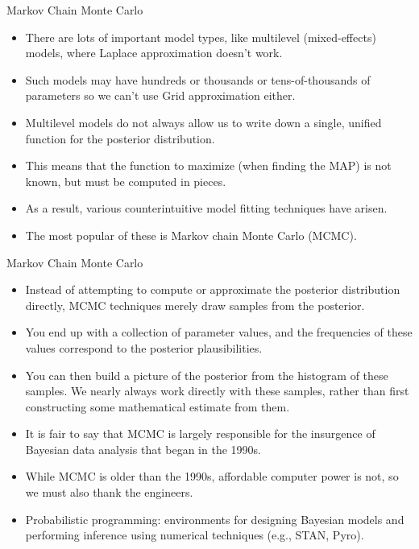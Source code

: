 \documentclass[handout]{beamer}
\begin{document}
\begin{frame}{Markov Chain Monte Carlo}
\scriptsize{

\begin{itemize}
\item There are lots of important model types, like multilevel (mixed-effects) models, where Laplace approximation doesn't work.
\item Such models may have hundreds or thousands or tens-of-thousands of parameters so we can't use Grid approximation either.
\item Multilevel models do not always allow us to write down a single, unified function for the posterior distribution.
\item This means that the function to maximize (when finding the MAP) is not known, but must be computed in pieces. 
\item As a result, various counterintuitive model fitting techniques have arisen. 
\item The most popular of these is Markov chain Monte Carlo (MCMC).
\end{itemize}


} 
\end{frame}


\begin{frame}{Markov Chain Monte Carlo}
\scriptsize{

\begin{itemize}
\item Instead of attempting to compute or approximate the posterior distribution directly, MCMC techniques merely draw samples from the posterior.
\item You end up with a collection of parameter values, and the frequencies of these values correspond to the posterior plausibilities.
\item You can then build a picture of the posterior from the histogram of these samples.
We nearly always work directly with these samples, rather than first constructing some
mathematical estimate from them.
\item It is fair to say that MCMC is largely responsible for the insurgence of Bayesian data analysis that began in the 1990s. 
\item While MCMC is older than the 1990s, affordable computer power is not, so we must also thank the engineers.
\item Probabilistic programming: environments for designing Bayesian models and performing inference using numerical techniques (e.g., STAN, Pyro).
\end{itemize}


} 
\end{frame}
\end{document}
